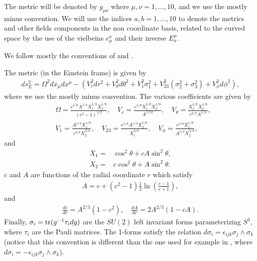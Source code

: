 
The metric will be denoted by $g_{\mu \nu}$ where $\mu,\nu = 1,...,10$, and we use the mostly minus convention.
We will use the indices $a,b=1,...,10$ to denote the metrics and other fields components in the non coordinate basis, related to the curved space by the use of the vielbeins $e_\mu^a$ and their inverse $E_a^\mu$.

We follow mostly the conventions of \cite{Pilch:2003jg} and \cite{Buchel:2000cn}.

The metric (in the Einstein frame) is given by
\begin{align}\label{eq:PWmetric}
ds_E^2 =
\Omega^2 dx_\mu dx^\mu -\left(
V_r^2 dr^2 + V_\theta^2 d\theta^2 + V_1^2 \sigma_1^2 + V_{23}^2 (\sigma_2^2 + \sigma_3^2) + V_\phi^2 d\phi^2\right),
\end{align}
where we use the mostly minus convention.
The various coefficients are given by
\begin{align}\label{eq:PWvielbeins}
& \Omega = \frac{c^{1/8} A^{1/4} X_1^{1/8} X_2^{1/8}}{(c^2 - 1)^{1/2}},\quad
V_r = \frac{c^{1/8}X_1^{1/8} X_2^{1/8}}{A^{1/12}},\quad
V_\theta = \frac{X_1^{1/8} X_2^{1/8}}{c^{3/8}A^{1/4}},\nonumber\\
&
V_1 = \frac{A^{1/4}X_1^{1/8} }{c^{3/8}X_2^{3/8}},\quad
V_{23} = \frac{c^{1/8}A^{1/4}X_2^{1/8} }{X_1^{3/8}},\quad
V_\phi = \frac{c^{1/8}X_1^{1/8} }{A^{1/4}X_2^{3/8}},
\end{align}
and
\begin{align}
X_1 = & \cos^2\theta + cA  \sin^2\theta,\nonumber\\
X_2 = & c \cos^2\theta + A  \sin^2\theta.
\end{align}
$c$ and $A$ are functions of the radial coordinate $r$ which satisfy
\begin{align}
A  = c+(c^2 -1)\frac{1}{2}\ln\left(\frac{c-1}{c+1}\right),
\end{align}
and
\begin{align}
\frac{dc}{dr} = A^{2/3}(1-c^2),\quad
\frac{d A}{dr} = 2 A^{2/3}\left(1 - c A\right).
\end{align}
Finally, $\sigma_i = \mathop{\mathrm{tr}}(g^{-1}\tau_i d g)$ are the $SU(2)$ left invariant forms parameterizing $S^3$, where $\tau_i$ are the Pauli matrices. The 1-forms satisfy the relation $d\sigma_i  = \epsilon_{i j k} \sigma_j \wedge \sigma_k$ (notice that this convention is different than the one used for example in \cite{Buchel:2000cn}, where $d\sigma_i  = -\epsilon_{i j k} \sigma_j \wedge \sigma_k$).
